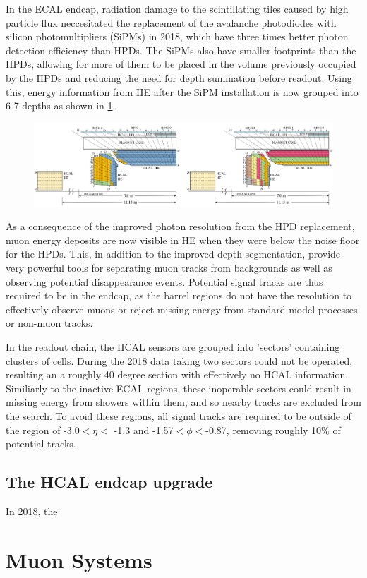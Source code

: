 In the ECAL endcap, radiation damage to the scintillating tiles caused by high particle flux neccesitated the replacement of the avalanche photodiodes with silicon photomultipliers (SiPMs) in 2018, which have three times better photon detection efficiency than HPDs.  
The SiPMs also have smaller footprints than the HPDs, allowing for more of them to be placed in the volume previously occupied by the HPDs and reducing the need for depth summation before readout. 
Using this, energy information from HE after the SiPM installation is now grouped into 6-7 depths as shown in \cref{fig:HElayout}.

\begin{figure}[!htpb]
	   \centering
	      \includegraphics[width=\textwidth]{figures/HE_upgrade.jpg}
		    \label{fig:HElayout}
\end{figure}

As a consequence of the improved photon resolution from the HPD replacement, muon energy deposits are now visible in HE when they were below the noise floor for the HPDs. 
This, in addition to the improved depth segmentation, provide very powerful tools for separating muon tracks from backgrounds as well as observing potential disappearance events.
Potential signal tracks are thus required to be in the endcap, as the barrel regions do not have the resolution to effectively observe muons or reject missing energy from standard model processes or non-muon tracks.

In the readout chain, the HCAL sensors are grouped into 'sectors' containing clusters of cells. During the 2018 data taking two sectors could not be operated, resulting an a roughly 40 degree section with effectively no HCAL information. Similiarly to the inactive ECAL regions, these inoperable sectors could result in missing energy from showers within them, and so nearby tracks are excluded from the search. 
To avoid these regions, all signal tracks are required to be outside of the region of -3.0$<\eta<$ -1.3 and -1.57$<\phi<$-0.87, removing roughly 10$\%$ of potential tracks.

\subsection{The HCAL endcap upgrade}
\label{sec:hcalUpgrade}
In 2018, the 
\section{Muon Systems}
